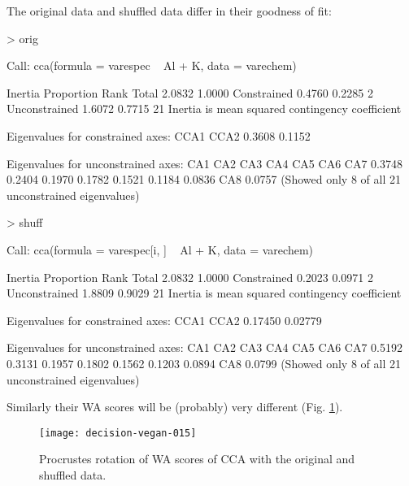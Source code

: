 \documentclass[a4paper,10pt,twocolumn]{article}
\begin{document}
The original data and shuffled data differ in their goodness of
fit:
\begin{Schunk}
\begin{Sinput}
> orig
\end{Sinput}
\begin{Soutput}
Call: cca(formula = varespec ~ Al + K, data =
varechem)

              Inertia Proportion Rank
Total          2.0832     1.0000     
Constrained    0.4760     0.2285    2
Unconstrained  1.6072     0.7715   21
Inertia is mean squared contingency coefficient 

Eigenvalues for constrained axes:
  CCA1   CCA2 
0.3608 0.1152 

Eigenvalues for unconstrained axes:
   CA1    CA2    CA3    CA4    CA5    CA6    CA7 
0.3748 0.2404 0.1970 0.1782 0.1521 0.1184 0.0836 
   CA8 
0.0757 
(Showed only 8 of all 21 unconstrained eigenvalues)
\end{Soutput}
\begin{Sinput}
> shuff
\end{Sinput}
\begin{Soutput}
Call: cca(formula = varespec[i, ] ~ Al + K, data
= varechem)

              Inertia Proportion Rank
Total          2.0832     1.0000     
Constrained    0.2023     0.0971    2
Unconstrained  1.8809     0.9029   21
Inertia is mean squared contingency coefficient 

Eigenvalues for constrained axes:
   CCA1    CCA2 
0.17450 0.02779 

Eigenvalues for unconstrained axes:
   CA1    CA2    CA3    CA4    CA5    CA6    CA7 
0.5192 0.3131 0.1957 0.1802 0.1562 0.1203 0.0894 
   CA8 
0.0799 
(Showed only 8 of all 21 unconstrained eigenvalues)
\end{Soutput}
\end{Schunk}
Similarly their WA scores will be (probably) very different
(Fig. \ref{fig:ccawa}).
\begin{figure}
\texttt{[image: decision-vegan-015]}
\caption{Procrustes rotation of WA scores of CCA with the original and
  shuffled data.}
\label{fig:ccawa}
\end{figure}
\end{document}
